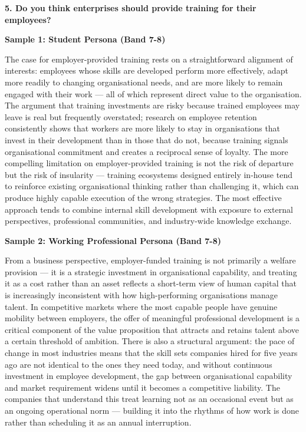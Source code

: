 \separator

\begin{ieltsquestion}
\textbf{5. Do you think enterprises should provide training for their employees?}
\end{ieltsquestion}
\textbf{Sample 1: Student Persona (Band 7-8)}

The case for employer-provided training rests on a straightforward alignment of interests: employees whose skills are developed perform more effectively, adapt more readily to changing organisational needs, and are more likely to remain engaged with their work — all of which represent direct value to the organisation. The argument that training investments are risky because trained employees may leave is real but frequently overstated; research on employee retention consistently shows that workers are more likely to stay in organisations that invest in their development than in those that do not, because training signals organisational commitment and creates a reciprocal sense of loyalty. The more compelling limitation on employer-provided training is not the risk of departure but the risk of insularity — training ecosystems designed entirely in-house tend to reinforce existing organisational thinking rather than challenging it, which can produce highly capable execution of the wrong strategies. The most effective approach tends to combine internal skill development with exposure to external perspectives, professional communities, and industry-wide knowledge exchange.

\textbf{Sample 2: Working Professional Persona (Band 7-8)}

From a business perspective, employer-funded training is not primarily a welfare provision — it is a strategic investment in organisational capability, and treating it as a cost rather than an asset reflects a short-term view of human capital that is increasingly inconsistent with how high-performing organisations manage talent. In competitive markets where the most capable people have genuine mobility between employers, the offer of meaningful professional development is a critical component of the value proposition that attracts and retains talent above a certain threshold of ambition. There is also a structural argument: the pace of change in most industries means that the skill sets companies hired for five years ago are not identical to the ones they need today, and without continuous investment in employee development, the gap between organisational capability and market requirement widens until it becomes a competitive liability. The companies that understand this treat learning not as an occasional event but as an ongoing operational norm — building it into the rhythms of how work is done rather than scheduling it as an annual interruption.

